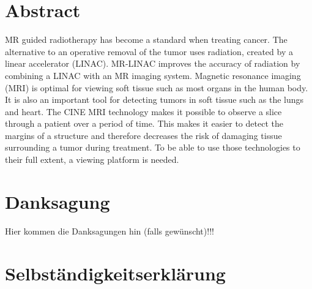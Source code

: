 \documentclass[12pt,a4paper,twoside]{report}
\begin{document}

\setcounter{page}{1}



\thispagestyle{plain}
\section*{Abstract}

MR guided radiotherapy has become a standard when treating cancer. The alternative to an operative removal of the tumor uses radiation, created by a linear accelerator (LINAC). MR-LINAC improves the accuracy of radiation by combining a LINAC with an MR imaging system. Magnetic resonance imaging (MRI) is optimal for viewing soft tissue such as most organs in the human body. It is also an important tool for detecting tumors in soft tissue such as the lungs and heart.
The CINE MRI technology makes it possible to observe a slice through a patient over a period of time.
This makes it easier to detect the margins of a structure and therefore decreases the risk of damaging tissue surrounding a tumor during treatment.
To be able to use those technologies to their full extent, a viewing platform is needed.
\newpage


\thispagestyle{plain}
\section*{Danksagung}

Hier kommen die Danksagungen hin (falls gewünscht)!!!

\newpage

\thispagestyle{empty}
\section*{Selbständigkeitserklärung}

\end{document}
